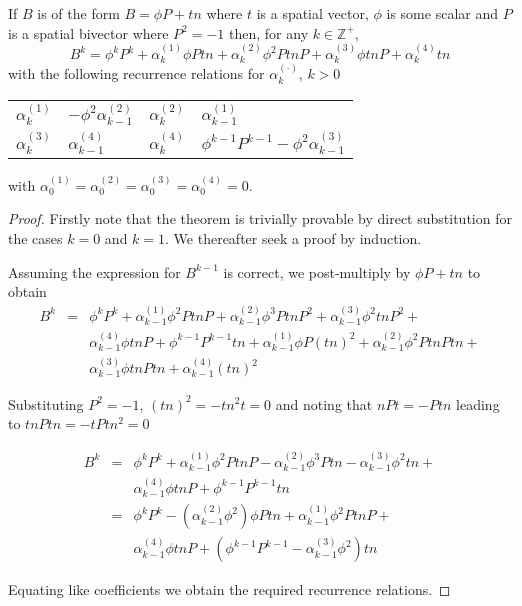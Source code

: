 \begin{lemma}
\label{lem:bk}
If $B$ is of the form $B=\phi P+tn$ where 
$t$ is a spatial vector, $\phi$ is some scalar and $P$ is a spatial bivector
where $P^2 = -1$ then, for any $k \in \mathbb{Z}^+$, 
\[
B^{k}=\phi^k P^{k}+\alpha _{k}^{(1)}\phi Ptn+
\alpha _{k}^{(2)}\phi^2 PtnP+\alpha _{k}^{(3)}\phi tnP+\alpha _{k}^{(4)}tn
\]
with the following recurrence relations for $\alpha _{k}^{(\cdot )}$,
$k>0$ 

\begin{centering}

\begin{tabular}{r@{$\ =\ $}lr@{$\ =\ $}l}
$\alpha _{k}^{(1)}$ & $- \phi^2 \alpha _{k-1}^{(2)}$ &
$\alpha _{k}^{(2)}$ & $\alpha _{k-1}^{(1)}$\\
$\alpha _{k}^{(3)}$ & $\alpha _{k-1}^{(4)}$ &
$\alpha _{k}^{(4)}$ & $\phi^{k-1}P^{k-1} - \phi^2 \alpha_{k-1}^{(3)}$
\end{tabular}

\end{centering}

\noindent with 
$\alpha _{0}^{(1)}=\alpha _{0}^{(2)}=
\alpha _{0}^{(3)}=\alpha _{0}^{(4)}=0$.
\end{lemma}
\begin{proof}
Firstly note that the theorem is trivially provable by direct 
substitution for the cases $k=0$ and $k=1$. We thereafter seek a 
proof by induction.

Assuming the expression for $B^{k-1}$ is correct, we post-multiply
by $\phi P+tn$ to obtain
\begin{eqnarray*}
B^k & = & \phi^k P^k + \alpha_{k-1}^{(1)}\phi^2 PtnP + 
          \alpha_{k-1}^{(2)}\phi^3 PtnP^2 + \alpha_{k-1}^{(3)}\phi^2 tnP^2 + \\
    &   & \alpha_{k-1}^{(4)}\phi tnP + \phi^{k-1} P^{k-1} tn + \alpha_{k-1}^{(1)}\phi P(tn)^2 +
          \alpha_{k-1}^{(2)}\phi^2 PtnPtn + \\
    &   & \alpha_{k-1}^{(3)}\phi tnPtn +
	  \alpha_{k-1}^{(4)}(tn)^2
\end{eqnarray*}

Substituting $P^2 = -1$, $(tn)^2 = - tn^2t = 0$ and noting that
$nPt = - Ptn$ leading to $tnPtn = - tPtn^2 = 0$

\begin{eqnarray*}
B^k & = & \phi^k P^k + \alpha_{k-1}^{(1)}\phi^2 PtnP -
          \alpha_{k-1}^{(2)}\phi^3 Ptn - \alpha_{k-1}^{(3)}\phi^2 tn + \\
    &   & \alpha_{k-1}^{(4)}\phi tnP + \phi^{k-1} P^{k-1} tn \\
    & = & \phi^k P^k - (\alpha_{k-1}^{(2)}\phi^2)\phi Ptn +
          \alpha_{k-1}^{(1)}\phi^2 PtnP + \\
    &   & \alpha_{k-1}^{(4)}\phi tnP +
	  (\phi^{k-1} P^{k-1}  - \alpha_{k-1}^{(3)}\phi^2) tn
\end{eqnarray*}

Equating like coefficients we obtain the required recurrence relations.
\end{proof}

